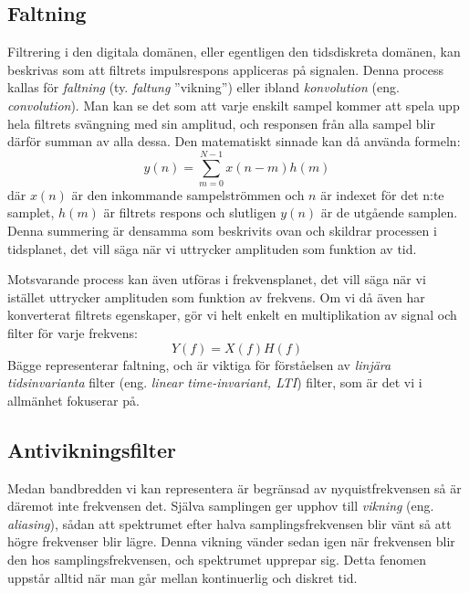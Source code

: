 \subsection{Faltning}

Filtrering i den digitala domänen, eller egentligen den tidsdiskreta domänen,
kan beskrivas som att filtrets impulsrespons appliceras på signalen. Denna
process kallas för \emph{faltning} (ty. \emph{faltung} ''vikning'') eller ibland
\emph{konvolution} (eng. \emph{convolution}).
Man kan se det som att varje enskilt sampel kommer att spela upp hela filtrets
svängning med sin amplitud, och responsen från alla sampel blir därför summan
av alla dessa.
Den matematiskt sinnade kan då använda formeln:
\[y(n) = \sum_{m=0}^{N-1} x(n-m)h(m)\]
där \(x(n)\) är den inkommande sampelströmmen och \(n\) är indexet för det
n:te samplet, \(h(m)\) är filtrets respons och slutligen \(y(n)\) är de utgående
samplen.
Denna summering är densamma som beskrivits ovan och skildrar processen
i tidsplanet, det vill säga när vi uttrycker amplituden som funktion av tid.

Motsvarande process kan även utföras i frekvensplanet, det vill säga när vi 
istället uttrycker amplituden som funktion av frekvens.
Om vi då även har konverterat filtrets egenskaper, gör vi helt enkelt en
multiplikation av signal och filter för varje frekvens:
\[Y(f) = X(f)H(f)\]
Bägge representerar faltning, och är viktiga för förståelsen av \emph{linjära
tidsinvarianta} filter (eng. \emph{linear time-invariant, LTI}) filter,
som är det vi i allmänhet fokuserar på.

\subsection{Antivikningsfilter}

Medan bandbredden vi kan representera är begränsad av nyquistfrekvensen så
är däremot inte frekvensen det.
Själva samplingen ger upphov till \emph{vikning} (eng. \emph{aliasing}),
sådan att spektrumet efter halva samplingsfrekvensen blir vänt så att högre
frekvenser blir lägre.
Denna vikning vänder sedan igen när frekvensen blir den hos
samplingsfrekvensen, och spektrumet upprepar sig.
Detta fenomen uppstår alltid när man går mellan kontinuerlig och diskret tid.

